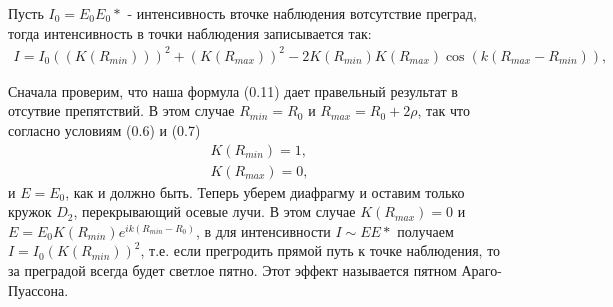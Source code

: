 \documentclass[__main__.tex]{subfiles}
\begin{document}
Пусть $I_0 = E_0 E_0*$ - интенсивность вточке наблюдения вотсутствие преград, тогда интенсивность в точки наблюдения записывается так:
\begin{gather}
I = I_0 ((K(R_{min})))^2 +(K(R_{max}))^2 - 2K(R_{min})K(R_{max})\cos(k(R_{max}-R_{min})) ,
\end{gather}

Сначала проверим, что наша формула (0.11)
дает правельный результат в отсутвие препятствий. В этом случае $R_{min} = R_0$ и $R_{max} = R_0 + 2\rho$, так что согласно условиям (0.6) и (0.7)
\begin{gather}
K(R_{min}) = 1 ,\\
K(R_{max}) = 0 ,
\end{gather}
и $E = E_0$, как и должно быть.
Теперь уберем диафрагму и оставим только кружок $D_2$, перекрывающий осевые лучи. В этом случае $K(R_{max}) = 0$ и $E=E_0 K(R_{min})e^{ik(R_{min}-R_0)}$, в для интенсивности $I \sim EE*$ получаем $I = I_0 (K(R_{min}))^2$, т.е. если прегродить прямой путь к точке наблюдения, то за преградой всегда будет светлое пятно. Этот эффект называется пятном Араго-Пуассона.\\
\end{document}

